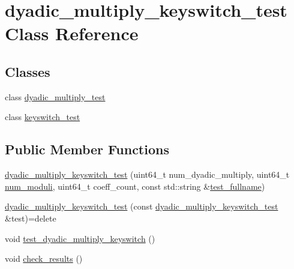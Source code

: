 \hypertarget{classdyadic__multiply__keyswitch__test}{\section{dyadic\-\_\-multiply\-\_\-keyswitch\-\_\-test Class Reference}
\label{classdyadic__multiply__keyswitch__test}
}
\subsection*{Classes}
\begin{DoxyCompactItemize}
\item 
class \hyperlink{classdyadic__multiply__keyswitch__test_1_1dyadic__multiply__test}{dyadic\-\_\-multiply\-\_\-test}
\item 
class \hyperlink{classdyadic__multiply__keyswitch__test_1_1keyswitch__test}{keyswitch\-\_\-test}
\end{DoxyCompactItemize}
\subsection*{Public Member Functions}
\begin{DoxyCompactItemize}
\item 
\hyperlink{classdyadic__multiply__keyswitch__test_a1fc5f6836d76b98a09dc7ee8a1844394}{dyadic\-\_\-multiply\-\_\-keyswitch\-\_\-test} (uint64\-\_\-t num\-\_\-dyadic\-\_\-multiply, uint64\-\_\-t \hyperlink{bench__dyadic__multiply_8cpp_a94cbf59cad79634589387a30784ed78d}{num\-\_\-moduli}, uint64\-\_\-t coeff\-\_\-count, const std\-::string \&\hyperlink{bench__keyswitch_8cpp_af98ed5ee0025fea2f25864641c3f5727}{test\-\_\-fullname})
\item 
\hyperlink{classdyadic__multiply__keyswitch__test_a69940476c4ea70509b2ddc594662a19a}{dyadic\-\_\-multiply\-\_\-keyswitch\-\_\-test} (const \hyperlink{classdyadic__multiply__keyswitch__test}{dyadic\-\_\-multiply\-\_\-keyswitch\-\_\-test} \&test)=delete
\item 
void \hyperlink{classdyadic__multiply__keyswitch__test_a6e543689d7aaee6f92e8d074fd45b4a7}{test\-\_\-dyadic\-\_\-multiply\-\_\-keyswitch} ()
\item 
void \hyperlink{classdyadic__multiply__keyswitch__test_ac36414e1ab6000e3d32f98d4589d76e2}{check\-\_\-results} ()
\end{DoxyCompactItemize}


